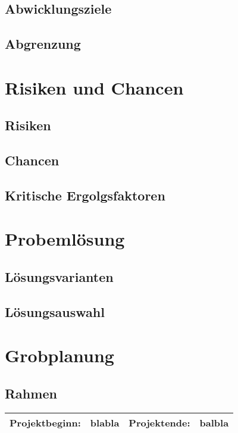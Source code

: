 \subsection{Abwicklungsziele}

\subsection{Abgrenzung}


\section{Risiken und Chancen}

\subsection{Risiken}

\subsection{Chancen}

\subsection{Kritische Ergolgsfaktoren}


\section{Probemlösung}

\subsection{Lösungsvarianten}

\subsection{Lösungsauswahl}


\section{Grobplanung}

\subsection{Rahmen}

\begin{tabular}{ | l | l | l | l |}
    \hline
    Projektbeginn: & blabla & Projektende: & balbla \\ \hline
\end{tabular}

